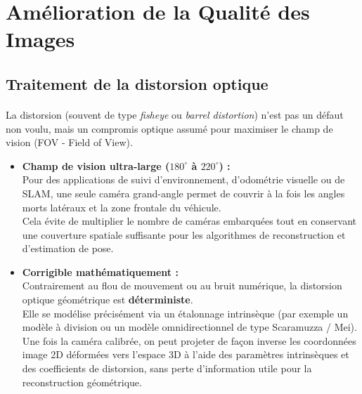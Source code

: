 \documentclass[12pt,a4paper,oneside]{report}
\begin{document}
\section{Amélioration de la Qualité des Images}

\subsection{Traitement de la distorsion optique}

\paragraph{}
La distorsion (souvent de type \textit{fisheye} ou \textit{barrel distortion}) n'est pas un défaut non voulu, mais un compromis optique assumé pour maximiser le champ de vision (FOV - Field of View).

\begin{itemize}
    \item \textbf{Champ de vision ultra-large ($180^\circ$ à $220^\circ$) :}\\
    \hspace*{.5cm} Pour des applications de suivi d'environnement, d'odométrie visuelle ou de SLAM, une seule caméra grand-angle permet de couvrir à la fois les angles morts latéraux et la zone frontale du véhicule.\\
    Cela évite de multiplier le nombre de caméras embarquées tout en conservant une couverture spatiale suffisante pour les algorithmes de reconstruction et d'estimation de pose.

    \item \textbf{Corrigible mathématiquement :}\\
    \hspace*{.5cm} Contrairement au flou de mouvement ou au bruit numérique, la distorsion optique géométrique est \textbf{déterministe}.\\
    Elle se modélise précisément via un étalonnage intrinsèque (par exemple un modèle à division ou un modèle omnidirectionnel de type Scaramuzza / Mei).\\
    \hspace*{.5cm} Une fois la caméra calibrée, on peut projeter de façon inverse les coordonnées image 2D déformées vers l'espace 3D à l'aide des paramètres intrinsèques et des coefficients de distorsion, sans perte d'information utile pour la reconstruction géométrique.
\end{itemize}
\end{document}

